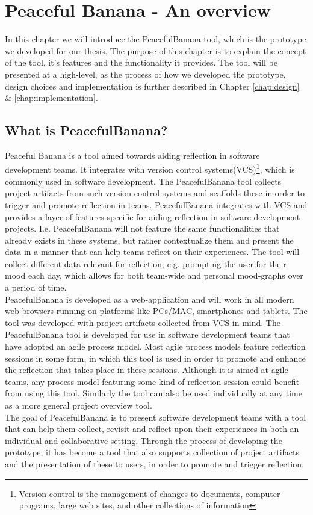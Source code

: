 \chapter{Peaceful Banana - An overview}
\label{peacefulBananaApplication}
In this chapter we will introduce the PeacefulBanana tool, which is the prototype we developed for our thesis. The purpose of this chapter is to explain the concept of the tool, it's features and the functionality it provides. The tool will be presented at a high-level, as the process of how we developed the prototype, design choices and implementation is further described in Chapter \ref{chap:design} \& \ref{chap:implementation}.
\section{What is PeacefulBanana?}
Peaceful Banana is a tool aimed towards aiding reflection in software development teams. It integrates with version control systems(VCS)\footnote{Version control is the management of changes to documents, computer programs, large web sites, and other collections of information}, which is commonly used in software development. The PeacefulBanana tool collects project artifacts from such version control systems and scaffolds these in order to trigger and promote reflection in teams. PeacefulBanana integrates with VCS and provides a layer of features specific for aiding reflection in software development projects. I.e.  PeacefulBanana will not feature the same functionalities that already exists in these systems, but rather contextualize them and present the data in a manner that can help teams reflect on their experiences. The tool will collect different data relevant for reflection, e.g. prompting the user for their mood each day, which allows for both team-wide and personal mood-graphs over a period of time. \\
PeacefulBanana is developed as a web-application and will work in all modern web-browsers running on platforms like PCs/MAC, smartphones and tablets.
The tool was developed with project artifacts collected from VCS in mind. The PeacefulBanana tool is developed for use in software development teams that have adopted an agile process model. Most agile process models feature reflection sessions in some form, in which this tool is used in order to promote and enhance the reflection that takes place in these sessions. Although it is aimed at agile teams, any process model featuring some kind of reflection session could benefit from using this tool. Similarly the tool can also be used individually at any time as a more general project overview tool. \\
The goal of PeacefulBanana is to present software development teams with a tool that can help them collect, revisit and reflect upon their experiences in both an individual and collaborative setting. Through the process of developing the prototype, it has become a tool that also supports collection of project artifacts and the presentation of these to users, in order to promote and trigger reflection. 

